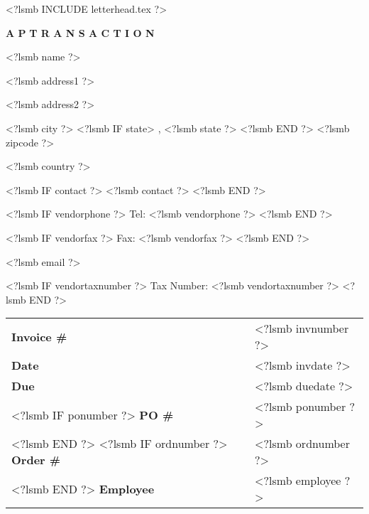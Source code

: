 \documentclass{scrartcl}
\begin{document}
\pagestyle{myheadings}
\thispagestyle{empty}

\fontsize{10pt}{12pt}\selectfont

<?lsmb INCLUDE letterhead.tex ?>

\centerline{\textbf{A P} \hspace{0.3cm} \textbf{T R A N S A C T I O N}}

\vspace*{0.5cm}

\parbox[t]{.5\textwidth}{
<?lsmb name ?>

<?lsmb address1 ?>

<?lsmb address2 ?>

<?lsmb city ?>
<?lsmb IF state>
\hspace{-0.1cm}, <?lsmb state ?>
<?lsmb END ?> <?lsmb zipcode ?>

<?lsmb country ?>

\vspace{0.3cm}

<?lsmb IF contact ?>
<?lsmb contact ?>
\vspace{0.2cm}
<?lsmb END ?>

<?lsmb IF vendorphone ?>
Tel: <?lsmb vendorphone ?>
<?lsmb END ?>

<?lsmb IF vendorfax ?>
Fax: <?lsmb vendorfax ?>
<?lsmb END ?>

<?lsmb email ?>

<?lsmb IF vendortaxnumber ?>
Tax Number: <?lsmb vendortaxnumber ?>
<?lsmb END ?>
}
\hfill
\begin{tabular}[t]{ll}
  \textbf{Invoice \#} & <?lsmb invnumber ?> \\
  \textbf{Date} & <?lsmb invdate ?> \\
  \textbf{Due} & <?lsmb duedate ?> \\
  <?lsmb IF ponumber ?>
    \textbf{PO \#} & <?lsmb ponumber ?> \\
  <?lsmb END ?>
  <?lsmb IF ordnumber ?>
    \textbf{Order \#} & <?lsmb ordnumber ?> \\
  <?lsmb END ?>
  \textbf{Employee} & <?lsmb employee ?> \\
\end{tabular}

\vspace{1cm}
\end{document}
